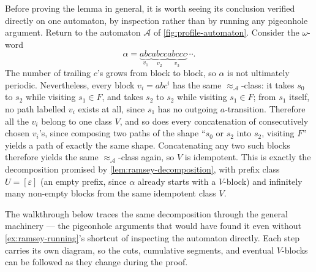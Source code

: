 \begin{example}
\label{ex:ramsey-running}
Before proving the lemma in general, it is worth seeing its conclusion
verified directly on one automaton, by inspection rather than by
running any pigeonhole argument.  Return to the automaton
$\mathcal A$ of \cref{fig:profile-automaton}.  Consider the $\omega$-word
\[
  \alpha =
  \underbrace{abc}_{\textstyle v_1}
  \underbrace{abcc}_{\textstyle v_2}
  \underbrace{abccc}_{\textstyle v_3}\cdots .
\]
The number of trailing $c$'s grows from block to block, so $\alpha$ is
not ultimately periodic.  Nevertheless, every block $v_i=ab c^i$ has
the same $\approx_{\mathcal A}$-class: it takes $s_0$ to $s_2$ while visiting
$s_1\in F$, and takes $s_2$ to $s_2$ while visiting $s_1\in F$; from
$s_1$ itself, no path labelled $v_i$ exists at all, since $s_1$ has no
outgoing $a$-transition.  Therefore all the $v_i$ belong to one class
$V$, and so does every concatenation of consecutively chosen $v_i$'s,
since composing two paths of the shape ``$s_0$ or $s_2$ into $s_2$,
visiting $F$'' yields a path of exactly the same shape.  Concatenating
any two such blocks therefore yields the same $\approx_{\mathcal A}$-class
again, so $V$ is idempotent.  This is exactly the decomposition
promised by \cref{lem:ramsey-decomposition}, with prefix class
$U=[\varepsilon]$ (an empty prefix, since $\alpha$ already starts with
a $V$-block) and infinitely many non-empty blocks from the same
idempotent class $V$.
\end{example}

The walkthrough below traces the same decomposition through the
general machinery --- the pigeonhole arguments that would have found
it even without \cref{ex:ramsey-running}'s shortcut of inspecting the
automaton directly.  Each step carries its own diagram, so the cuts,
cumulative segments, and eventual $V$-blocks can be followed as they
change during the proof.

